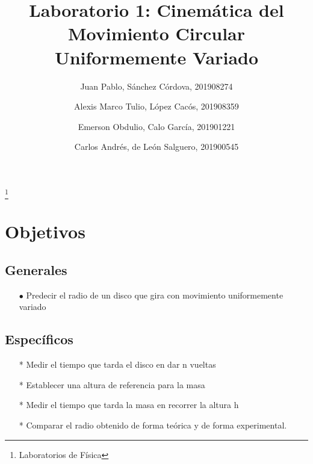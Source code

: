 \documentclass[osajnl,twocolumn,showpacs,superscriptaddress,10pt]{revtex4-1}
\begin{document}
\title{Laboratorio 1: Cinemática del Movimiento Circular Uniformemente Variado}
\thanks{Laboratorios de Física}

\author{Juan Pablo, Sánchez Córdova, 201908274}
%
\author{Alexis Marco Tulio, López Cacós, 201908359}
%
\author{Emerson Obdulio, Calo García, 201901221}
%
\author{Carlos Andrés, de León Salguero, 201900545}
%

\begin{abstract}
\end{abstract}

\maketitle{}

\section{Objetivos}

\subsection{Generales}
\begin{itemize}
\item[$\bullet$] Predecir el radio de un disco que gira con movimiento uniformemente variado
\end{itemize}
\subsection{Específicos}
\begin{itemize}
\item[*] Medir el tiempo que tarda el disco en dar n vueltas
\item[*] Establecer una altura de referencia para la masa
\item[*] Medir el tiempo que tarda la masa en recorrer la altura h
\item[*] Comparar el radio obtenido de forma teórica y de forma experimental.
\end{itemize}
 
\end{document}
